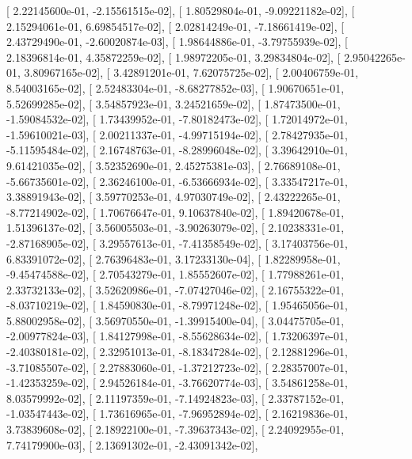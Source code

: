 \documentclass{article}
\begin{document}
       [  2.22145600e-01,  -2.15561515e-02],
       [  1.80529804e-01,  -9.09221182e-02],
       [  2.15294061e-01,   6.69854517e-02],
       [  2.02814249e-01,  -7.18661419e-02],
       [  2.43729490e-01,  -2.60020874e-03],
       [  1.98644886e-01,  -3.79755939e-02],
       [  2.18396814e-01,   4.35872259e-02],
       [  1.98972205e-01,   3.29834804e-02],
       [  2.95042265e-01,   3.80967165e-02],
       [  3.42891201e-01,   7.62075725e-02],
       [  2.00406759e-01,   8.54003165e-02],
       [  2.52483304e-01,  -8.68277852e-03],
       [  1.90670651e-01,   5.52699285e-02],
       [  3.54857923e-01,   3.24521659e-02],
       [  1.87473500e-01,  -1.59084532e-02],
       [  1.73439952e-01,  -7.80182473e-02],
       [  1.72014972e-01,  -1.59610021e-03],
       [  2.00211337e-01,  -4.99715194e-02],
       [  2.78427935e-01,  -5.11595484e-02],
       [  2.16748763e-01,  -8.28996048e-02],
       [  3.39642910e-01,   9.61421035e-02],
       [  3.52352690e-01,   2.45275381e-03],
       [  2.76689108e-01,  -5.66735601e-02],
       [  2.36246100e-01,  -6.53666934e-02],
       [  3.33547217e-01,   3.38891943e-02],
       [  3.59770253e-01,   4.97030749e-02],
       [  2.43222265e-01,  -8.77214902e-02],
       [  1.70676647e-01,   9.10637840e-02],
       [  1.89420678e-01,   1.51396137e-02],
       [  3.56005503e-01,  -3.90263079e-02],
       [  2.10238331e-01,  -2.87168905e-02],
       [  3.29557613e-01,  -7.41358549e-02],
       [  3.17403756e-01,   6.83391072e-02],
       [  2.76396483e-01,   3.17233130e-04],
       [  1.82289958e-01,  -9.45474588e-02],
       [  2.70543279e-01,   1.85552607e-02],
       [  1.77988261e-01,   2.33732133e-02],
       [  3.52620986e-01,  -7.07427046e-02],
       [  2.16755322e-01,  -8.03710219e-02],
       [  1.84590830e-01,  -8.79971248e-02],
       [  1.95465056e-01,   5.88002958e-02],
       [  3.56970550e-01,  -1.39915400e-04],
       [  3.04475705e-01,  -2.00977824e-03],
       [  1.84127998e-01,  -8.55628634e-02],
       [  1.73206397e-01,  -2.40380181e-02],
       [  2.32951013e-01,  -8.18347284e-02],
       [  2.12881296e-01,  -3.71085507e-02],
       [  2.27883060e-01,  -1.37212723e-02],
       [  2.28357007e-01,  -1.42353259e-02],
       [  2.94526184e-01,  -3.76620774e-03],
       [  3.54861258e-01,   8.03579992e-02],
       [  2.11197359e-01,  -7.14924823e-03],
       [  2.33787152e-01,  -1.03547443e-02],
       [  1.73616965e-01,  -7.96952894e-02],
       [  2.16219836e-01,   3.73839608e-02],
       [  2.18922100e-01,  -7.39637343e-02],
       [  2.24092955e-01,   7.74179900e-03],
       [  2.13691302e-01,  -2.43091342e-02],
\end{document}
